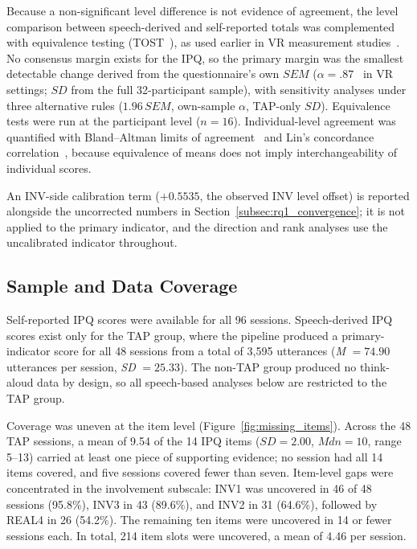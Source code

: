 Because a non-significant level difference is not evidence of agreement, the level comparison between speech-derived and self-reported totals was complemented with equivalence testing (TOST~\cite{lakens2017equivalence,lakens2018tutorial}), as used earlier in VR measurement studies~\cite{lee2012equivalence,sanaei2024scene,johnsdorf2025memory}. No consensus margin exists for the IPQ, so the primary margin was the smallest detectable change derived from the questionnaire's own $SEM$ ($\alpha=.87$~\cite{schwind2019presence} in VR settings; $SD$ from the full 32-participant sample), with sensitivity analyses under three alternative rules ($1.96\,SEM$, own-sample $\alpha$, TAP-only $SD$). Equivalence tests were run at the participant level ($n=16$). Individual-level agreement was quantified with Bland--Altman limits of agreement~\cite{bland1986statistical} and Lin's concordance correlation~\cite{lin1989concordance}, because equivalence of means does not imply interchangeability of individual scores.

An INV-side calibration term ($+0.5535$, the observed INV level offset) is reported alongside the uncorrected numbers in Section~\ref{subsec:rq1_convergence}; it is not applied to the primary indicator, and the direction and rank analyses use the uncalibrated indicator throughout.


\subsection{Sample and Data Coverage}
\label{subsec:sample}

Self-reported IPQ scores were available for all 96 sessions. Speech-derived IPQ scores exist only for the TAP group, where the pipeline produced a primary-indicator score for all 48 sessions from a total of 3{,}595 utterances (\textit{M} $=74.90$ utterances per session, \textit{SD} $=25.33$). The non-TAP group produced no think-aloud data by design, so all speech-based analyses below are restricted to the TAP group.

Coverage was uneven at the item level (Figure~\ref{fig:missing_items}). Across the 48 TAP sessions, a mean of 9.54 of the 14 IPQ items ($SD=2.00$, $Mdn=10$, range 5--13) carried at least one piece of supporting evidence; no session had all 14 items covered, and five sessions covered fewer than seven. Item-level gaps were concentrated in the involvement subscale: INV1 was uncovered in 46 of 48 sessions (95.8\%), INV3 in 43 (89.6\%), and INV2 in 31 (64.6\%), followed by REAL4 in 26 (54.2\%). The remaining ten items were uncovered in 14 or fewer sessions each. In total, 214 item slots were uncovered, a mean of 4.46 per session.

